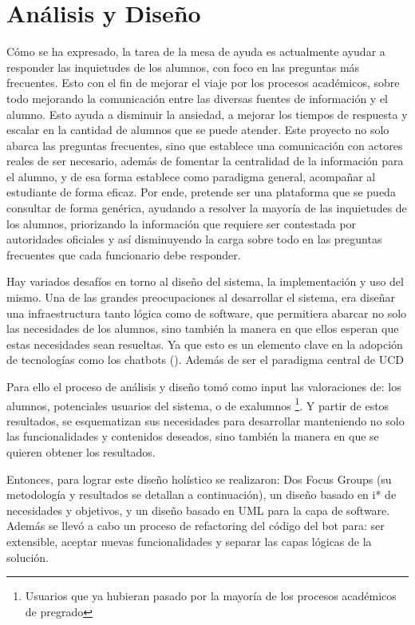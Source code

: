 \chapter{Análisis y Diseño}
    \par Cómo se ha expresado, la tarea de la mesa de ayuda es actualmente ayudar a responder las inquietudes de los alumnos, con foco en las preguntas más frecuentes. Esto con el fin de mejorar el viaje por los procesos académicos, sobre todo mejorando la comunicación entre las diversas fuentes de información y el alumno. Esto ayuda a disminuir la ansiedad, a mejorar los tiempos de respuesta y escalar en la cantidad de alumnos que se puede atender. Este proyecto no solo abarca las preguntas frecuentes, sino que establece una comunicación con actores reales de ser necesario, además de fomentar la centralidad de la información para el alumno, y de esa forma establece como paradigma general, acompañar al estudiante de forma eficaz. Por ende, pretende ser una plataforma que se pueda consultar de forma genérica, ayudando a resolver la mayoría de las inquietudes de los alumnos, priorizando la información que requiere ser contestada por autoridades oficiales y así disminuyendo la carga sobre todo en las preguntas frecuentes que cada funcionario debe responder.
    \par Hay variados desafíos en torno al diseño del sistema, la implementación y uso del mismo. Una de las grandes preocupaciones al desarrollar el sistema, era diseñar una infraestructura tanto lógica como de software, que permitiera abarcar no solo las necesidades de los alumnos, sino también la manera en que ellos esperan que estas necesidades sean resueltas. Ya que esto es un elemento clave en la adopción de tecnologías como los chatbots (). Además de ser el paradigma central de \acrlong{UCD}
    \par Para ello el proceso de análisis y diseño tomó como input las valoraciones de: los alumnos, potenciales usuarios del sistema, o de exalumnos \footnote{Usuarios que ya hubieran pasado por la mayoría de los procesos académicos de pregrado}. Y partir de estos resultados, se esquematizan sus necesidades para  desarrollar manteniendo no solo las funcionalidades y contenidos deseados, sino también la manera en que se quieren obtener los resultados.
    \par Entonces, para lograr este diseño holístico se realizaron: Dos Focus Groups (su metodología y resultados se detallan a continuación), un diseño basado en i* de necesidades y objetivos, y un diseño basado en UML para la capa de software. Además se llevó a cabo un proceso de refactoring del código del bot para: ser extensible, aceptar nuevas funcionalidades y separar las capas lógicas de la solución.

